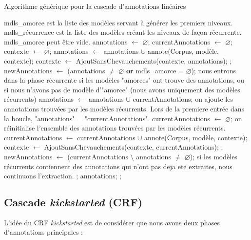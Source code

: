 \documentclass[12pt,a4paper,times,twoside,openright]{report}
\begin{document}
\begin{algorithm}[ht!]
\caption{Algorithme générique pour la cascade d'annotations linéaires}
\label{alg:AnnotationCascade}
\begin{algorithmic}
    \State \Comment mdls\_amorce est la liste des modèles servant à générer les premiers niveaux.
    \State \Comment mdls\_récurrence est la liste des modèles créant les niveaux de façon récurrente.
    \State \Comment mdls\_amorce peut être vide.
    \State annotations $\gets$ $\varnothing$;
    \State currentAnnotations $\gets$ $\varnothing$;
    \State contexte $\gets$ $\varnothing$;
        \State annotations $\gets$ annotations $\cup$ annote(Corpus, modèle, contexte);
        \State contexte $\gets$ AjoutSansChevauchements(contexte, annotations);
    \EndFor;
    \State newAnnotations $\gets$ (annotations $\neq$ $\varnothing$ \textbf{or} mdls\_amorce = $\varnothing$); \Comment nous entrons dans la phase récurrente si les modèles "amorces" ont trouve des annotations, ou si nous n'avons pas de modèle d'"amorce" (nous avons uniquement des modèles récurrents)
        \State annotations $\gets$ annotations $\cup$ currentAnnotations; \Comment on ajoute les annotations trouvées par les modèles récurrents. Lors de la premiere entrée dans la boucle, "annotations" = "currentAnnotations".
        \State currentAnnotations $\gets$ $\varnothing$; \Comment on réinitialise l'ensemble des annotations trouvées par les modèles récurrents.
            \State currentAnnotations $\gets$ currentAnnotations $\cup$ annote(Corpus, modèle, contexte);
            \State contexte $\gets$ AjoutSansChevauchements(contexte, currentAnnotations);
        \EndFor;
        \State newAnnotations $\gets$ (currentAnnotations $\setminus$ annotations $\neq$ $\varnothing$); \Comment si les modèles récurrents contiennent des annotations qui n'ont pas deja ete extraites, nous continuons l'extraction.
    \EndWhile;
    \State \Return annotations;
    \EndFunction;
\end{algorithmic}
\end{algorithm}


    
        \subsection{Cascade \textit{kickstarted} (CRF)}
        \label{subsec:kickstart-parsing}
        L'idée du CRF \textit{kickstarted} est de considérer que nous avons deux phases d'annotations principales :
\end{document}
